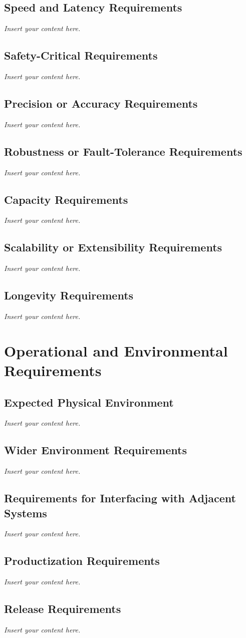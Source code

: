 \documentclass[12pt]{article}
\newcommand{\lips}{\textit{Insert your content here.}}
\begin{document}
\subsection{Speed and Latency Requirements}
\lips
\subsection{Safety-Critical Requirements}
\lips
\subsection{Precision or Accuracy Requirements}
\lips
\subsection{Robustness or Fault-Tolerance Requirements}
\lips
\subsection{Capacity Requirements}
\lips
\subsection{Scalability or Extensibility Requirements}
\lips
\subsection{Longevity Requirements}
\lips

\section{Operational and Environmental Requirements}
\subsection{Expected Physical Environment}
\lips
\subsection{Wider Environment Requirements}
\lips
\subsection{Requirements for Interfacing with Adjacent Systems}
\lips
\subsection{Productization Requirements}
\lips
\subsection{Release Requirements}
\lips
\end{document}
